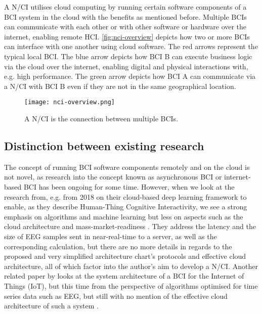 A N/CI utilises cloud computing by running certain software components of a BCI system in the cloud with the benefits as mentioned before. Multiple BCIs can communicate with each other or with other software or hardware over the internet, enabling remote HCI. \autoref{fig:nci-overview} depicts how two or more BCIs can interface with one another using cloud software. The red arrows represent the typical local BCI. The blue arrow depicts how BCI B  can execute business logic via the cloud over the internet, enabling digital and physical interactions with, e.g. high performance. The green arrow depicts how BCI A can communicate via a N/CI with BCI B even if they are not in the same geographical location.

\begin{figure}[ht]
  \centering
  \texttt{[image: nci-overview.png]}
  \caption{A N/CI is the connection between multiple BCIs.}
  \label{fig:nci-overview}
\end{figure}

\subsection{Distinction between existing research}
\label{chapter2-distinction-between-existing-research}

The concept of running BCI software components remotely and on the cloud is not novel, as research into the concept known as asynchronous BCI \citep{an_design_2016} or internet-based BCI \citep{lampe_brain-computer_2014} has been ongoing for some time. However, when we look at the research from, e.g. \citeauthor{zhang_internet_2018} from 2018 on their cloud-based deep learning framework to enable, as they describe Human-Thing Cognitive Interactivity, we see a strong emphasis on algorithms and machine learning but less on aspects such as the cloud architecture and mass-market-readiness \citep{zhang_internet_2018}. They address the latency and the size of EEG samples sent in near-real-time to a server, as well as the corresponding calculation, but there are no more details in regards to the proposed and very simplified architecture chart's protocols and effective cloud architecture, all of which factor into the author's aim to develop a N/CI. Another related paper by \citeauthor{ahamad_system_2022} looks at the system architecture of a BCI for the Internet of Things (IoT), but this time from the perspective of algorithms optimised for time series data such as EEG, but still with no mention of the effective cloud architecture of such a system \citep{ahamad_system_2022}.

